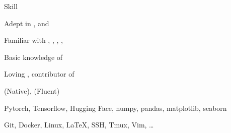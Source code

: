 \begin{rubric}{Skill}
  \entry*[Coding]%

  Adept in ,  and

  Familiar with , , ,
  , 

  Basic knowledge of 

  Loving , contributor of 

  \entry*[Language]%
   (Native),  (Fluent)

  \entry*[AI Framework]%
  Pytorch, Tensorflow, Hugging Face, numpy, pandas, matplotlib, seaborn

  \entry*[Tools]%
  Git, Docker, Linux, \LaTeX, SSH, Tmux, Vim, \ldots
\end{rubric}
